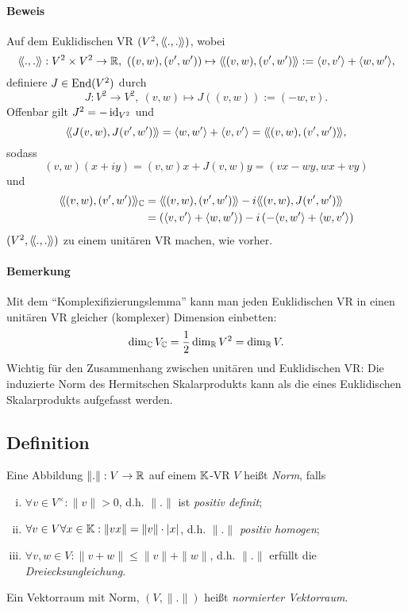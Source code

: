 \paragraph{Beweis}
	Auf dem Euklidischen VR $ (V^2,\langle\! \langle .,. \rangle\! \rangle) $, wobei
		\[ \SSkl{.}{.}:V^2\times V^2 \to \R,\ \left((v,w),(v',w')\right)\mapsto \SSkl{(v,w)}{(v',w')} := \Skl{v}{v'}+\Skl{w}{w'}, \]
	definiere $ J\in \operatorname{End}(V^2) $ durch
		\[ J:V^2 \to V^2,\ (v,w)\mapsto J\left((v,w)\right):= (-w,v). \]
	Offenbar gilt $ J^2 = -\operatorname{id}_{V^2} $ und
		\[ \langle\! \langle J(v,w),J(v',w') \rangle\! \rangle = \langle w,w' \rangle+\langle v,v' \rangle = \langle\! \langle (v,w),(v',w') \rangle\! \rangle, \]
	sodass
		\[ (v,w)(x+iy) = (v,w)x+J(v,w)y= (vx-wy,wx+vy) \]
	und
		\begin{align*}
			\langle\! \langle (v,w),(v',w') \rangle\! \rangle_{\mathbb{C}} &= \langle\! \langle (v,w),(v',w') \rangle\! \rangle-i\langle\! \langle (v,w),J(v',w') \rangle\! \rangle  \\
			&= \left(\langle v,v' \rangle+\langle w,w' \rangle\right) -i\left(-\langle v,w' \rangle+\langle w,v' \rangle\right)
		\end{align*}
	$ (V^2,\langle\! \langle .,. \rangle\! \rangle) $ zu einem unitären VR machen, wie vorher.
\paragraph{Bemerkung}
	Mit dem "`Komplexifizierungslemma"' kann man jeden Euklidischen VR in einen unitären VR gleicher (komplexer) Dimension einbetten:
		\[ \dim_{\mathbb{C}} V_{\mathbb{C}} = \frac{1}{2}\dim_{\mathbb{R}} V^2 = \dim_{\mathbb{R}} V. \]
	Wichtig für den Zusammenhang zwischen unitären und Euklidischen VR:
	Die induzierte Norm des Hermitschen Skalarprodukts kann als die eines Euklidischen Skalarprodukts aufgefasst werden.
	
\subsection{Definition}
\begin{Definition}
	Eine Abbildung $ \|.\|:V\to \mathbb{R} $ auf einem $ \mathbb{K} $-VR $ V $ heißt \emph{Norm}, falls
	\begin{enumerate}[(i)]
		\item $ \forall v\in V^\times: \|v\| > 0 $, d.h. $ \|.\| $ ist \emph{positiv definit};
		\item $ \forall v\in V \forall x\in \mathbb{K}: \|vx\| = \|v\|\cdot |x| $, d.h. $ \|.\| $ \emph{positiv homogen};
		\item $ \forall v,w\in V: \| v+w\|\leq \|v\| + \|w\| $, d.h. $ \|.\| $ erfüllt die \emph{Dreiecksungleichung}.
	\end{enumerate}
	Ein Vektorraum mit Norm, $ (V,\|.\|) $ heißt \emph{normierter Vektorraum}.
\end{Definition}

